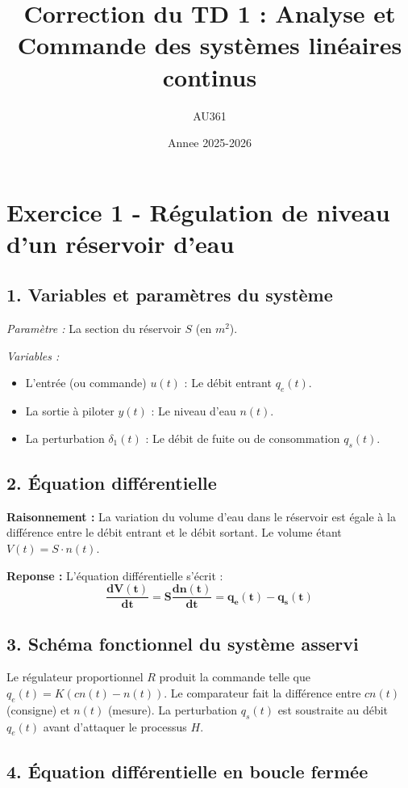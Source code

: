 \documentclass[11pt,a4paper]{article}
\title{Correction du TD 1 : Analyse et Commande des systèmes linéaires continus}
\author{AU361}
\date{Annee 2025-2026}
\begin{document}
\maketitle

\section*{Exercice 1 - Régulation de niveau d'un réservoir d'eau}

\subsection*{1. Variables et paramètres du système}

\textit{Paramètre :} La section du réservoir $S$ (en $m^2$).

\textit{Variables :}
\begin{itemize}
    \item L'entrée (ou commande) $u(t)$ : Le débit entrant $q_e(t)$.
    \item La sortie à piloter $y(t)$ : Le niveau d'eau $n(t)$.
    \item La perturbation $\delta_1(t)$ : Le débit de fuite ou de consommation $q_s(t)$.
\end{itemize}

\subsection*{2. Équation différentielle}

\textbf{Raisonnement :} La variation du volume d'eau dans le réservoir est égale à la différence entre le débit entrant et le débit sortant. Le volume étant $V(t) = S \cdot n(t)$.

\textbf{Reponse :} L'équation différentielle s'écrit :
$$
\mathbf{\frac{dV(t)}{dt} = S \frac{dn(t)}{dt} = q_e(t) - q_s(t)}
$$

\subsection*{3. Schéma fonctionnel du système asservi}

Le régulateur proportionnel $R$ produit la commande telle que $q_e(t) = K(cn(t) - n(t))$.
Le comparateur fait la différence entre $cn(t)$ (consigne) et $n(t)$ (mesure).
La perturbation $q_s(t)$ est soustraite au débit $q_e(t)$ avant d'attaquer le processus $H$.

\subsection*{4. Équation différentielle en boucle fermée}
\end{document}
